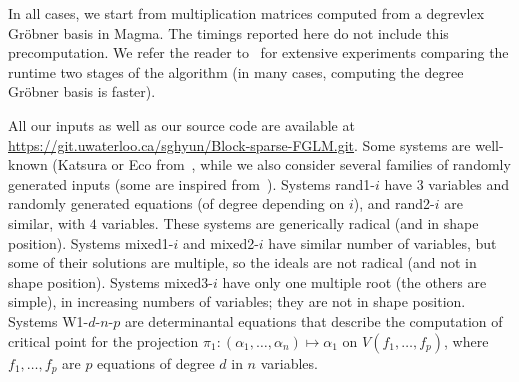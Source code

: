 \documentclass[12pt]{article}
\begin{document}
In all cases, we start from multiplication matrices computed from a
{degrevlex} Gr\"obner basis in Magma. The timings reported here do not
include this precomputation. We refer the reader to~\cite{FaMo17} for
extensive experiments comparing the runtime two stages of the
algorithm (in many cases, computing the degree Gr\"obner basis is
faster). 

All our inputs as well as our source code are available at
\url{https://git.uwaterloo.ca/sghyun/Block-sparse-FGLM.git}. Some systems are well-known (Katsura or Eco
from~\cite{Morgan88}, while we also consider several families of
randomly generated inputs (some are inspired
from~\cite{FaMo17}). Systems rand1-$i$ have $3$ variables and randomly
generated equations (of degree depending on $i$), and rand2-$i$ are
similar, with $4$ variables. These systems are generically radical
(and in shape position). Systems mixed1-$i$ and mixed2-$i$ have
similar number of variables, but some of their solutions are multiple,
so the ideals are not radical (and not in shape position). Systems
mixed3-$i$ have only one multiple root (the others are simple), in
increasing numbers of variables; they are not in shape
position. Systems W1-$d$-$n$-$p$ are determinantal equations that
describe the computation of critical point for the projection $\pi_1:
(\alpha_1,\dots,\alpha_n) \mapsto \alpha_1$ on $V(f_1,\dots,f_p)$,
where $f_1,\dots,f_p$ are $p$ equations of degree $d$ in $n$
variables.
\end{document}
